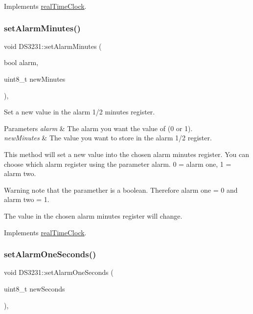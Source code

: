Implements \mbox{\hyperlink{classreal_time_clock_a9f0cd64ce9a783f149fcbb9f7eb36524}{real\+Time\+Clock}}.

\mbox{\label{class_d_s3231_a9c1f5b183c24f3062c1c8c299f46023c}} 
\subsubsection{\texorpdfstring{set\+Alarm\+Minutes()}{setAlarmMinutes()}}
{\footnotesize\ttfamily void D\+S3231\+::set\+Alarm\+Minutes (\begin{DoxyParamCaption}\item[{bool}]{alarm,  }\item[{uint8\+\_\+t}]{new\+Minutes }\end{DoxyParamCaption})\hspace{0.3cm}{\ttfamily [override]}, {\ttfamily [virtual]}}



Set a new value in the alarm 1/2 minutes register. 


\begin{DoxyParams}{Parameters}
{\em alarm} & The alarm you want the value of (0 or 1). \\
\hline
{\em new\+Minutes} & The value you want to store in the alarm 1/2 register.\\
\hline
\end{DoxyParams}
This method will set a new value into the chosen alarm minutes register. You can choose which alarm register using the parameter alarm. 0 = alarm one, 1 = alarm two. \begin{DoxyWarning}{Warning}
note that the paramether is a boolean. Therefore alarm one = 0 and alarm two = 1. 

The value in the chosen alarm minutes register will change. 
\end{DoxyWarning}


Implements \mbox{\hyperlink{classreal_time_clock_a53ffba88cd87d05af58288fb4fc589b5}{real\+Time\+Clock}}.

\mbox{\label{class_d_s3231_ae294f3c8c8634a058846cf9864ccc5c8}} 
\subsubsection{\texorpdfstring{set\+Alarm\+One\+Seconds()}{setAlarmOneSeconds()}}
{\footnotesize\ttfamily void D\+S3231\+::set\+Alarm\+One\+Seconds (\begin{DoxyParamCaption}\item[{uint8\+\_\+t}]{new\+Seconds }\end{DoxyParamCaption})\hspace{0.3cm}{\ttfamily [override]}, {\ttfamily [virtual]}}



